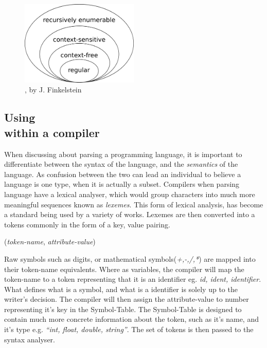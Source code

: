 \begin{figure}[!hbtp]
    \centerline{\includegraphics[width=0.5\textwidth]{img/Chomsky.png}}
    \caption{\hierarchy{}, by J. Finkelstein}
    \label{fig:Chomsky}
\end{figure}

\subsection{Using \hierarchy{} \\within a compiler}
When discussing about parsing a programming language, it is important to differentiate between the syntax of the language, and the \textit{semantics} of the language. As confusion between the two can lead an individual to believe a language is one type, when it is actually a subset. Compilers when parsing language have a lexical analyser, which would group characters into much more meaningful sequences known as \textit{lexemes}\cite{DragonBook}. This form of lexical analysis, has become a standard being used by a variety of works\cite{CompilerTutorial}\cite{CompilerBasics}\cite{CompilerConstruction}. Lexemes are then converted into a tokens commonly in the form of a key, value pairing. \\ \centerline{(\textit{token-name}, \textit{attribute-value})}

Raw symbols such as digits, or mathematical symbols(\textit{+,-,/,*}) are mapped into their token-name equivalents. Where as variables, the compiler will map the token-name to a token representing that it is an identifier eg. \textit{id, ident, identifier}. What defines what is a symbol, and what is a identifier is solely up to the \compiler{} writer's decision. The compiler will then assign the attribute-value to number representing it's key in the Symbol-Table. The Symbol-Table is designed to contain much more concrete information about the token, such as it's name, and it's type e.g. \textit{``int, float, double, string''}. The set of tokens is then passed to the syntax analyser.

